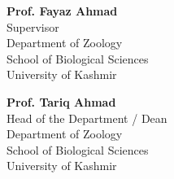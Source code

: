 \noindent
\begin{minipage}{0.48\textwidth}
\begin{flushleft}
\textbf{Prof. Fayaz Ahmad}\\
Supervisor\\
Department of Zoology\\
School of Biological Sciences\\
University of Kashmir
\end{flushleft}
\end{minipage}
\hfill
\begin{minipage}{0.48\textwidth}
\begin{flushright}
\textbf{Prof. Tariq Ahmad}\\
Head of the Department / Dean\\
Department of Zoology\\
School of Biological Sciences\\
University of Kashmir
\end{flushright}
\end{minipage}
